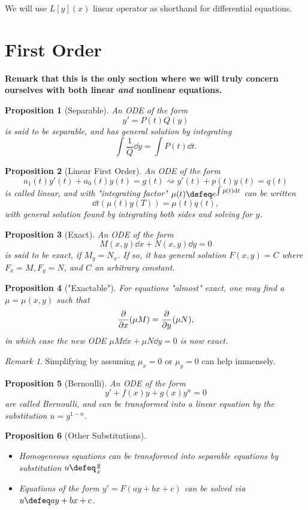 \documentclass[12pt, oneside]{article}
\theoremstyle{definition}
\theoremstyle{plain}
\newtheorem{prop}{Proposition}
\theoremstyle{remark}
\newtheorem{remark}{Remark}
\let\origsection=\section
\renewcommand\section[1]{\origsection{#1}\label{sec:\thesection}}
\begin{document}
We will use $L[y](x)$ linear operator as shorthand for differential equations.

\section{First Order}

\textbf{Remark that this is the only section where we will truly concern ourselves with both linear \emph{and} nonlinear equations.}
\begin{prop}[Separable]
An ODE of the form \[
y' = P(t)Q(y)  
\]  
is said to be separable, and has general solution by integrating \[
 \int \frac{1}{Q} \dd{y} = \int P(t) \dd{t}.  
\]
\end{prop}

\begin{prop}[Linear First Order]
  An ODE of the form \[
  a_1(t)y'(t) + a_0(t)y(t) = g(t) \rightsquigarrow y'(t) + p(t)y(t) = q(t)  
  \]
  is called linear, and with "integrating factor" $\mu(t) \defeq e^{\int p(t) \dd{t}}$ can be written \[
  \dd{t}(\mu(t) y(T)) = \mu(t) q(t),
  \]
  with general solution found by integrating both sides and solving for $y$.
\end{prop}

\begin{prop}[Exact]
  An ODE of the form \[
  M(x, y) \dd{x} + N(x, y) \dd{y} = 0  
  \]
  is said to be exact, if $M_y= N_x$. If so, it has general solution $F(x,y) = C$ where $F_x = M, F_y= N$, and $C$ an arbitrary constant.
\end{prop}

\begin{prop}["Exactable"]
For equations "almost" exact, one may find a $\mu = \mu(x, y)$ such that \[
\pdv{x} (\mu M) = \pdv{y}(\mu N),
\]
in which case the new ODE $\mu M \dd{x} + \mu N \dd{y} = 0$ is now exact. 
\end{prop}
\begin{remark}
  Simplifying by assuming $\mu_x = 0$ or $\mu_y = 0$ can help immensely.
\end{remark}

\begin{prop}[Bernoulli]
  An ODE of the form \[
  y' + f(x)y + g(x)y^n = 0  
  \]
  are called Bernoulli, and can be transformed into a linear equation by the substitution $u = y^{1 - n}$.
\end{prop}

\begin{prop}[Other Substitutions]
  \begin{itemize}
    \item Homogeneous equations can be transformed into separable equations by substitution $u \defeq \frac{y}{x}$
    \item Equations of the form $y' = F(ay + bx + c)$ can be solved via $u \defeq ay + bx + c$.
  \end{itemize}
\end{prop}
\end{document}
